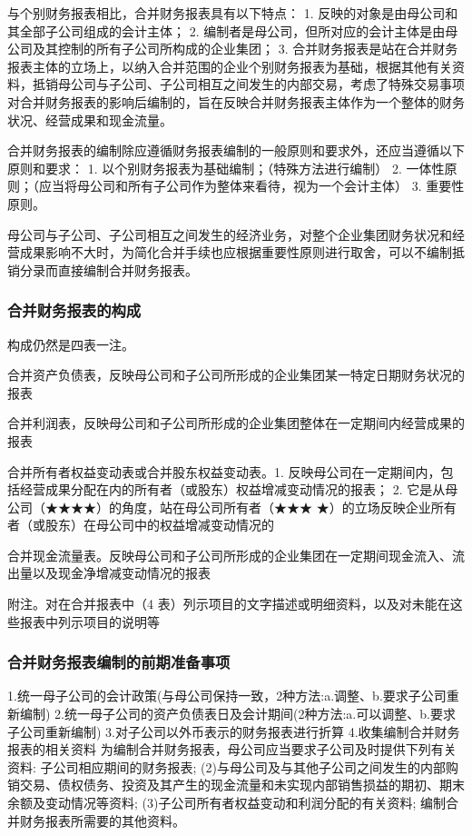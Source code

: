 \documentclass[UTF8,12pt]{ctexart}
\numberwithin{equation}{section} %
\numberwithin{figure}{section}
\numberwithin{table}{section}
\begin{document}
	与个别财务报表相比，合并财务报表具有以下特点：
	1.	反映的对象是由母公司和其全部子公司组成的会计主体；
	2.	编制者是母公司，但所对应的会计主体是由母公司及其控制的所有子公司所构成的企业集团；
	3.	合并财务报表是站在合并财务报表主体的立场上，以纳入合并范围的企业个别财务报表为基础，根据其他有关资料，抵销母公司与子公司、子公司相互之间发生的内部交易，考虑了特殊交易事项对合并财务报表的影响后编制的，旨在反映合并财务报表主体作为一个整体的财务状况、经营成果和现金流量。
	
	合并财务报表的编制除应遵循财务报表编制的一般原则和要求外，还应当遵循以下原则和要求：
	1.	以个别财务报表为基础编制；（特殊方法进行编制）
	2.	一体性原则；（应当将母公司和所有子公司作为整体来看待，视为一个会计主体）
	3.	重要性原则。
	
	母公司与子公司、子公司相互之间发生的经济业务，对整个企业集团财务状况和经营成果影响不大时，为简化合并手续也应根据重要性原则进行取舍，可以不编制抵销分录而直接编制合并财务报表。
	\subsubsection{合并财务报表的构成}
	构成仍然是四表一注。
	
	合并资产负债表，反映母公司和子公司所形成的企业集团某一特定日期财务状况的报表
	
	合并利润表，反映母公司和子公司所形成的企业集团整体在一定期间内经营成果的报表
	
	合并所有者权益变动表或合并股东权益变动表。1.	反映母公司在一定期间内，包括经营成果分配在内的所有者（或股东）权益增减变动情况的报表；
	2.	它是从母公司（★★★★）的角度，站在母公司所有者（★★★
	★）的立场反映企业所有者（或股东）在母公司中的权益增减变动情况的
	
	合并现金流量表。反映母公司和子公司所形成的企业集团在一定期间现金流入、流出量以及现金净增减变动情况的报表
	
	附注。对在合并报表中（4 表）列示项目的文字描述或明细资料，以及对未能在这些报表中列示项目的说明等
	\subsubsection{合并财务报表编制的前期准备事项}
	1.统一母子公司的会计政策(与母公司保持一致，2种方法:a.调整、b.要求子公司重新编制)
	2.统一母子公司的资产负债表日及会计期间(2种方法:a.可以调整、b.要求子公司重新编制)
	3.对子公司以外币表示的财务报表进行折算
	4.收集编制合并财务报表的相关资料
	为编制合并财务报表，母公司应当要求子公司及时提供下列有关资料:
	子公司相应期间的财务报表;
	(2)与母公司及与其他子公司之间发生的内部购销交易、债权债务、投资及其产生的现金流量和未实现内部销售损益的期初、期末余额及变动情况等资料;
	(3)子公司所有者权益变动和利润分配的有关资料;
	编制合并财务报表所需要的其他资料。
\end{document}
